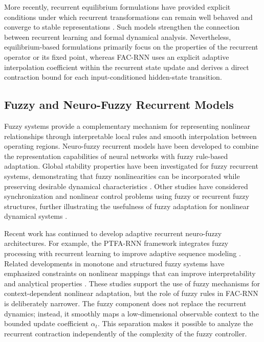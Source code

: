 \documentclass[journal]{IEEEtran}
\begin{document}
More recently, recurrent equilibrium formulations have provided explicit conditions under which recurrent transformations can remain well behaved and converge to stable representations \cite{revay2024recurrent}. Such models strengthen the connection between recurrent learning and formal dynamical analysis. Nevertheless, equilibrium-based formulations primarily focus on the properties of the recurrent operator or its fixed point, whereas FAC-RNN uses an explicit adaptive interpolation coefficient within the recurrent state update and derives a direct contraction bound for each input-conditioned hidden-state transition.

\subsection{Fuzzy and Neuro-Fuzzy Recurrent Models}

Fuzzy systems provide a complementary mechanism for representing nonlinear relationships through interpretable local rules and smooth interpolation between operating regions. Neuro-fuzzy recurrent models have been developed to combine the representation capabilities of neural networks with fuzzy rule-based adaptation. Global stability properties have been investigated for fuzzy recurrent systems, demonstrating that fuzzy nonlinearities can be incorporated while preserving desirable dynamical characteristics \cite{zhu2011global}. Other studies have considered synchronization and nonlinear control problems using fuzzy or recurrent fuzzy structures, further illustrating the usefulness of fuzzy adaptation for nonlinear dynamical systems \cite{mohammadzadeh2015synchronization}.

Recent work has continued to develop adaptive recurrent neuro-fuzzy architectures. For example, the PTFA-RNN framework integrates fuzzy processing with recurrent learning to improve adaptive sequence modeling \cite{cheng2025ptfar}. Related developments in monotone and structured fuzzy systems have emphasized constraints on nonlinear mappings that can improve interpretability and analytical properties \cite{teh2018monotone,kerk2025monotone}. These studies support the use of fuzzy mechanisms for context-dependent nonlinear adaptation, but the role of fuzzy rules in FAC-RNN is deliberately narrower. The fuzzy component does not replace the recurrent dynamics; instead, it smoothly maps a low-dimensional observable context to the bounded update coefficient $\alpha_t$. This separation makes it possible to analyze the recurrent contraction independently of the complexity of the fuzzy controller.
\end{document}
